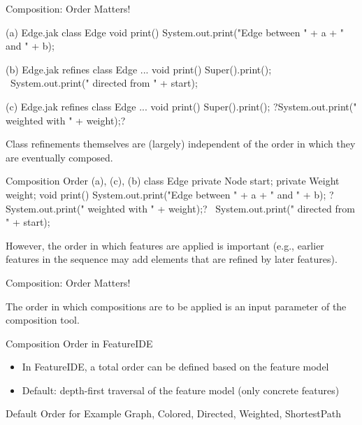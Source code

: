 \begin{frame}[fragile]{Composition: Order Matters!}
	\small
	\begin{fancycolumns}[animation=none]
\begin{codetight}[style=footnotesize]{(a) Edge.jak}
class Edge {
	void print() {
		System.out.print("Edge between " + a + " and " + b);
	}
}
\end{codetight}
\begin{codetight}[style=footnotesize]{(b) Edge.jak}
refines class Edge { ...
	void print() {
		Super().print();
		~System.out.print(" directed from " + start);~
	}
}
\end{codetight}
\begin{codetight}[style=footnotesize]{(c) Edge.jak}
refines class Edge { ...
	void print() {
		Super().print();
		?System.out.print(" weighted with " + weight);?
	}
}
\end{codetight}
	\nextcolumn
		\begin{note}{}
			Class refinements themselves are (largely) independent of the order in which they are eventually composed.
		\end{note}
\begin{codetight}[style=footnotesize]{Composition Order (a), (c), (b)}
class Edge {
	private Node start;
	private Weight weight;
	void print() {
		System.out.print("Edge between " + a + " and " + b);
		?System.out.print(" weighted with " + weight);?
		~System.out.print(" directed from " + start);~
	}
}
\end{codetight}
		\begin{note}{}
			However, the order in which features are applied is important 
			(e.g., earlier features in the sequence may add elements that are refined by later features). 
		\end{note}
	\end{fancycolumns}
\end{frame}

\begin{frame}{Composition: Order Matters!}
	\begin{fancycolumns}[b]
		\begin{note}{}
			The order in which compositions are to be applied is an input parameter of the composition tool.
		\end{note}
		\begin{note}{Composition Order in FeatureIDE}
			\begin{itemize}
				\item In FeatureIDE, a total order can be defined based on the feature model
				\item Default: depth-first traversal of the feature model (only concrete features)
			\end{itemize}
		\end{note}
	\nextcolumn
		\centering\featureDiagramGraphs
		\begin{example}{Default Order for Example}
			Graph, Colored, Directed, Weighted, ShortestPath
		\end{example}
	\end{fancycolumns}
\end{frame}

